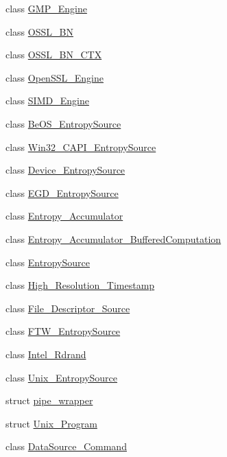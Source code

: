 \begin{DoxyCompactItemize}
\item 
class \hyperlink{classBotan_1_1GMP__Engine}{G\-M\-P\-\_\-\-Engine}
\item 
class \hyperlink{classBotan_1_1OSSL__BN}{O\-S\-S\-L\-\_\-\-B\-N}
\item 
class \hyperlink{classBotan_1_1OSSL__BN__CTX}{O\-S\-S\-L\-\_\-\-B\-N\-\_\-\-C\-T\-X}
\item 
class \hyperlink{classBotan_1_1OpenSSL__Engine}{Open\-S\-S\-L\-\_\-\-Engine}
\item 
class \hyperlink{classBotan_1_1SIMD__Engine}{S\-I\-M\-D\-\_\-\-Engine}
\item 
class \hyperlink{classBotan_1_1BeOS__EntropySource}{Be\-O\-S\-\_\-\-Entropy\-Source}
\item 
class \hyperlink{classBotan_1_1Win32__CAPI__EntropySource}{Win32\-\_\-\-C\-A\-P\-I\-\_\-\-Entropy\-Source}
\item 
class \hyperlink{classBotan_1_1Device__EntropySource}{Device\-\_\-\-Entropy\-Source}
\item 
class \hyperlink{classBotan_1_1EGD__EntropySource}{E\-G\-D\-\_\-\-Entropy\-Source}
\item 
class \hyperlink{classBotan_1_1Entropy__Accumulator}{Entropy\-\_\-\-Accumulator}
\item 
class \hyperlink{classBotan_1_1Entropy__Accumulator__BufferedComputation}{Entropy\-\_\-\-Accumulator\-\_\-\-Buffered\-Computation}
\item 
class \hyperlink{classBotan_1_1EntropySource}{Entropy\-Source}
\item 
class \hyperlink{classBotan_1_1High__Resolution__Timestamp}{High\-\_\-\-Resolution\-\_\-\-Timestamp}
\item 
class \hyperlink{classBotan_1_1File__Descriptor__Source}{File\-\_\-\-Descriptor\-\_\-\-Source}
\item 
class \hyperlink{classBotan_1_1FTW__EntropySource}{F\-T\-W\-\_\-\-Entropy\-Source}
\item 
class \hyperlink{classBotan_1_1Intel__Rdrand}{Intel\-\_\-\-Rdrand}
\item 
class \hyperlink{classBotan_1_1Unix__EntropySource}{Unix\-\_\-\-Entropy\-Source}
\item 
struct \hyperlink{structBotan_1_1pipe__wrapper}{pipe\-\_\-wrapper}
\item 
struct \hyperlink{structBotan_1_1Unix__Program}{Unix\-\_\-\-Program}
\item 
class \hyperlink{classBotan_1_1DataSource__Command}{Data\-Source\-\_\-\-Command}
\item 

\end{DoxyCompactItemize}
